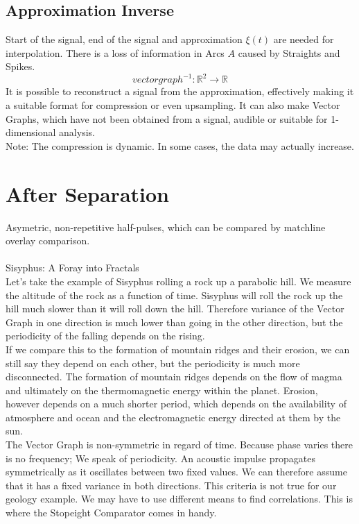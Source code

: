 \documentclass{report}
\begin{document}
\section{Approximation Inverse}
Start of the signal, end of the signal and approximation $\xi(t)$ are needed for interpolation. There is a loss of information in Arcs $A$ caused by Straights and Spikes.
\begin{equation}
vectorgraph^{-1}: \mathbb{R}^2 \rightarrow \mathbb{R}
\end{equation}
It is possible to reconstruct a signal from the approximation, effectively making it a suitable format for compression or even upsampling. It can also make Vector Graphs, which have not been obtained from a signal, audible or suitable for 1-dimensional analysis.\\
Note: The compression is dynamic. In some cases, the data may actually increase.



\chapter{After Separation}
Asymetric, non-repetitive half-pulses, which can be compared by matchline overlay comparison.\\\\
Sisyphus: A Foray into Fractals\\
Let's take the example of Sisyphus rolling a rock up a parabolic hill. We measure the altitude of the rock as a function of time. Sisyphus will roll the rock up the hill much slower than it will roll down the hill. Therefore variance of the Vector Graph in one direction is much lower than going in the other direction, but the periodicity of the falling depends on the rising.\\
If we compare this to the formation of mountain ridges and their erosion, we can still say they depend on each other, but the periodicity is much more disconnected. The formation of mountain ridges depends on the flow of magma and ultimately on the thermomagnetic energy within the planet. Erosion, however depends on a much shorter period, which depends on the availability of atmosphere and ocean and the electromagnetic energy directed at them by the sun.\\
The Vector Graph is non-symmetric in regard of time. Because phase varies there is no frequency; We speak of periodicity. An acoustic impulse propagates symmetrically as it oscillates between two fixed values. We can therefore assume that it has a fixed variance in both directions. This criteria is not true for our geology example. We may have to use different means to find correlations. This is where the Stopeight Comparator comes in handy.\\


\iffalse
\printbibliography
\fi
{}

\end{document}
